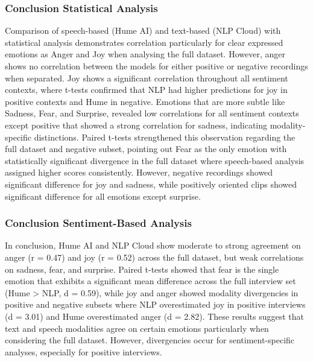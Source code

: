 \subsubsection{Conclusion Statistical Analysis}
Comparison of speech-based (Hume AI) and text-based (NLP Cloud) with statistical analysis demonstrates correlation particularly for clear expressed emotions as Anger and Joy when analysing the full dataset. 
However, anger shows no correlation between the models for either positive or negative recordings when separated. Joy shows a significant correlation throughout all sentiment contexts, 
where t-tests confirmed that NLP had higher predictions for joy in positive contexts and Hume in negative. 
Emotions that are more subtle like Sadness, Fear, and Surprise, revealed low correlations for all sentiment contexts except positive that showed a strong correlation for sadness, indicating modality-specific distinctions. 
Paired t-tests strengthened this observation regarding the full dataset and negative subset, pointing out Fear as the only emotion with statistically significant divergence in the full dataset where speech-based analysis assigned higher scores consistently. 
However, negative recordings showed significant difference for joy and sadness, while positively oriented clips showed significant difference for all emotions except surprise. 







\subsubsection{Conclusion Sentiment-Based Analysis}
In conclusion, Hume AI and NLP Cloud show moderate to strong agreement on anger (r = 0.47) and joy (r = 0.52) across the full dataset, but weak correlations on sadness, fear, and surprise. Paired t-tests showed that fear is the single emotion that exhibits a significant mean difference across the full interview set (Hume > NLP, d = 0.59), while joy and anger showed modality divergencies in positive and negative subsets where NLP overestimated joy in positive interviews (d = 3.01) and Hume overestimated anger (d = 2.82). These results suggest that text and speech modalities agree on certain emotions particularly when considering the full dataset. However, divergencies occur for sentiment-specific analyses, especially for positive interviews. 

